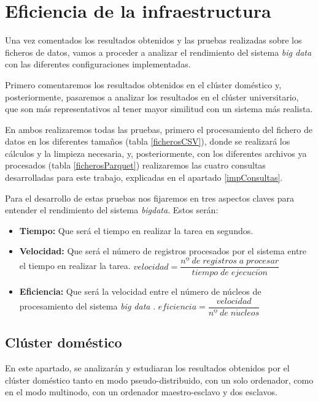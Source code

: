 \section{Eficiencia de la infraestructura}
Una vez comentados los resultados obtenidos y las pruebas realizadas sobre los ficheros de datos, vamos a proceder a analizar el rendimiento del sistema \textit{big data} con las diferentes configuraciones implementadas. 

Primero comentaremos los resultados obtenidos en el clúster doméstico y, posteriormente, pasaremos a analizar los resultados en el clúster universitario, que son más representativos al tener mayor similitud con un sistema más realista.

En ambos realizaremos todas las pruebas, primero el procesamiento del fichero de datos en los diferentes tamaños (tabla \ref{ficherosCSV}), donde se realizará los cálculos y la limpieza necesaria, y, posteriormente, con los diferentes archivos ya procesados (tabla \ref{ficherosParquet}) realizaremos las cuatro consultas desarrolladas para este trabajo, explicadas en el apartado \ref{impConsultas}.

Para el desarrollo de estas pruebas nos fijaremos en tres aspectos claves para entender el rendimiento del sistema \textit{bigdata}. Estos serán:

\begin{itemize}
	\item \textbf{Tiempo:} Que será el tiempo en realizar la tarea en segundos.
	\item \textbf{Velocidad:} Que será el número de registros procesados por el sistema entre el tiempo en realizar la tarea. $velocidad = \dfrac{nº \; de \; registros \; a \; procesar}{tiempo \; de \; ejecuci\acute{o}n}$
	\item \textbf{Eficiencia:} Que será la velocidad entre el número de núcleos de procesamiento del sistema \textit{big data} \cite{eficiencia}. $eficiencia = \dfrac{velocidad}{nº \; de \; n\acute{u}cleos}$
\end{itemize}

\subsection{Clúster doméstico}
En este apartado, se analizarán y estudiaran los resultados obtenidos por el clúster doméstico tanto en modo pseudo-distribuido, con un solo ordenador, como en el modo multinodo, con un ordenador maestro-esclavo y dos esclavos.

